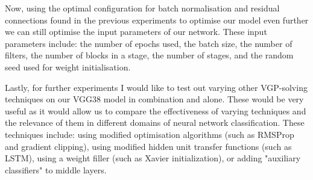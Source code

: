 {{Now, using the optimal configuration for batch normalisation and residual connections found in the previous experiments to optimise our model even further we can still optimise the input parameters of our network. These input parameters include: the number of epochs used, the batch size, the number of filters, the number of blocks in a stage, the number of stages, and the random seed used for weight initialisation.

Lastly, for further experiments I would like to test out varying other VGP-solving techniques on our VGG38 model in combination and alone. These would be very useful as it would allow us to compare the effectiveness of varying techniques and the relevance of them in different domains of neural network classification. These techniques include: using modified optimisation algorithms (such as RMSProp and gradient clipping), using modified hidden unit transfer functions (such as LSTM), using a weight filler (such as Xavier initialization), or adding "auxiliary classifiers" to middle layers.
%
%
%
}
}

